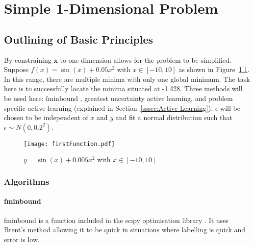 
\chapter{Simple 1-Dimensional Problem}

\ifpdf
    \graphicspath{{Chapter2/Figs/Raster/}{Chapter2/Figs/PDF/}{Chapter2/Figs/}}
\else
    \graphicspath{{Chapter2/Figs/Vector/}{Chapter2/Figs/}}
\fi

\section{Outlining of Basic Principles}

By constraining $\bm{x}$ to one dimension allows for the problem to be simplified. Suppose ${f(x)=\sin(x)+0.05x^2}$ with ${x\in [-10, 10]}$ as shown in Figure~\ref{fig:firstFunction}. In this range, there are multiple minima with only one global minimum. The task here is to successfully locate the minima situated at -1.428. Three methods will be used here: $\text{fminbound}$ \cite{2020SciPy-NMeth}, greatest uncertainty active learning, and problem specific active learning (explained in Section~\ref{sssec:Active Learning}). $\epsilon$ will be chosen to be independent of $x$ and $y$ and fit a normal distribution such that ${\epsilon\sim N(0, 0.2^2)}$.

\begin{figure}[htbp!] 
\centering    
\texttt{[image: firstFunction.pdf]}
\caption[First Function]{$y = \sin(x) + 0.005x^2$ with $x\in [-10, 10]$}
\label{fig:firstFunction}
\end{figure}

\subsection{Algorithms}
\label{ssec: algorithms}
\subsubsection{fminbound}
fminbound is a function included in the scipy optimisation library \cite{2020SciPy-NMeth}. It uses Brent's method allowing it to be quick in situations where labelling is quick and error is low.


